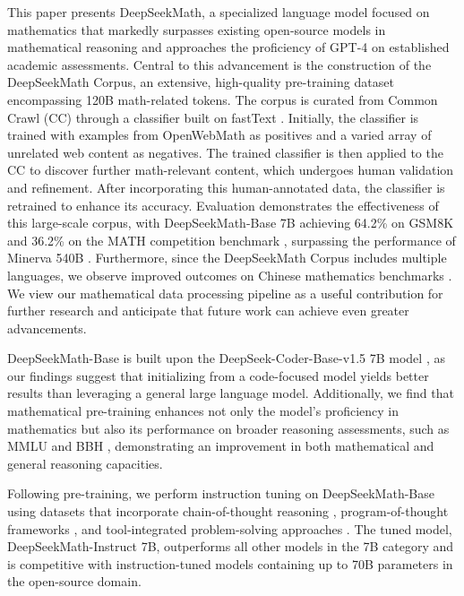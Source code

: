 This paper presents DeepSeekMath, a specialized language model focused on mathematics that markedly surpasses existing open-source models in mathematical reasoning and approaches the proficiency of GPT-4 on established academic assessments. Central to this advancement is the construction of the DeepSeekMath Corpus, an extensive, high-quality pre-training dataset encompassing 120B math-related tokens. The corpus is curated from Common Crawl (CC) through a classifier built on fastText \citep{joulin2016fasttext}. Initially, the classifier is trained with examples from OpenWebMath \citep{openwebmath} as positives and a varied array of unrelated web content as negatives. The trained classifier is then applied to the CC to discover further math-relevant content, which undergoes human validation and refinement. After incorporating this human-annotated data, the classifier is retrained to enhance its accuracy. Evaluation demonstrates the effectiveness of this large-scale corpus, with DeepSeekMath-Base 7B achieving 64.2\% on GSM8K \citep{gsm8k} and 36.2\% on the MATH competition benchmark \citep{MATH}, surpassing the performance of Minerva 540B \citep{minerva}. Furthermore, since the DeepSeekMath Corpus includes multiple languages, we observe improved outcomes on Chinese mathematics benchmarks \citep{wei2023cmath,agieval}. We view our mathematical data processing pipeline as a useful contribution for further research and anticipate that future work can achieve even greater advancements.

DeepSeekMath-Base is built upon the DeepSeek-Coder-Base-v1.5 7B model \citep{deepseek-coder}, as our findings suggest that initializing from a code-focused model yields better results than leveraging a general large language model. Additionally, we find that mathematical pre-training enhances not only the model’s proficiency in mathematics but also its performance on broader reasoning assessments, such as MMLU \citep{mmlu} and BBH \citep{bbh}, demonstrating an improvement in both mathematical and general reasoning capacities.

Following pre-training, we perform instruction tuning on DeepSeekMath-Base using datasets that incorporate chain-of-thought reasoning \citep{cot}, program-of-thought frameworks \citep{pot,pal}, and tool-integrated problem-solving approaches \citep{tora}. The tuned model, DeepSeekMath-Instruct 7B, outperforms all other models in the 7B category and is competitive with instruction-tuned models containing up to 70B parameters in the open-source domain.

